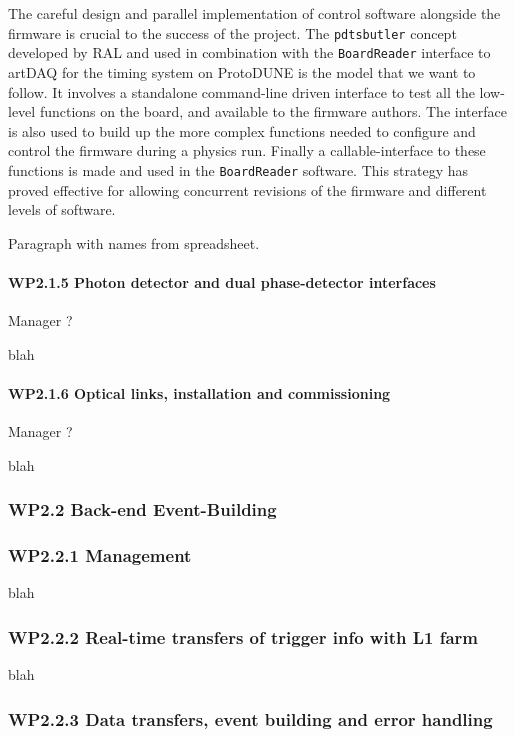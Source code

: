 \noindent
The careful design and parallel implementation of control software 
alongside the firmware is crucial to the success of the project.  
The \texttt{pdtsbutler} concept developed by RAL and used in 
combination with the \texttt{BoardReader} interface to artDAQ for 
the timing system on ProtoDUNE is the model that we want to follow.  
It involves a standalone command-line driven interface to test all 
the low-level functions on the board, and available to the firmware 
authors.  The interface is also used to build up the more complex 
functions needed to configure and control the firmware during a physics 
run.  Finally a callable-interface to these functions is made and 
used in the \texttt{BoardReader} software.   This strategy has proved 
effective for allowing concurrent revisions of the firmware and 
different levels of software.

Paragraph with names from spreadsheet.

\paragraph{WP2.1.5 Photon detector and dual phase-detector interfaces} Manager ?

\noindent
blah

\paragraph{WP2.1.6 Optical links, installation and commissioning} Manager ?

\noindent
blah

\subsubsection{WP2.2 Back-end Event-Building}



\subsubsection*{WP2.2.1 Management}

\noindent
blah

\subsubsection*{WP2.2.2 Real-time transfers of trigger info with L1 farm}

\noindent
blah

\subsubsection*{WP2.2.3 Data transfers, event building and error handling}

